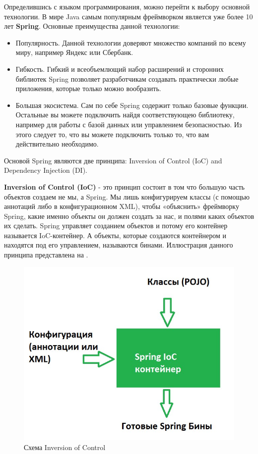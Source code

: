 Определившись с языком программирования, можно перейти к выбору основной технологии. В мире Java самым популярным фреймворком является уже более 10 лет \textbf{Spring}\cite{spring}. Основные преимущества данной технологии:

\begin{itemize}
	\item Популярность. Данной технологии доверяют множество компаний по всему миру, например Яндекс или Сбербанк.
	\item Гибкость. Гибкий и всеобъемлющий набор расширений и сторонних библиотек Spring позволяет разработчикам создавать практически любые приложения, которые только можно вообразить.   
	\item Большая экосистема. Сам по себе Spring содержит только базовые функции. Остальные вы можете подключить найдя соответствующею библиотеку, например для работы с базой данных или управлением безопасностью. Из этого следует то, что вы можете подключить только то, что вам действительно необходимо.
\end{itemize}  

Основой Spring являются две принципа: Inversion of Control (IoC) and Dependency Injection (DI).

\textbf{Inversion of Control (IoC)} - это принцип состоит в том что большую часть объектов создаем не мы, а Spring. Мы лишь конфигурируем классы (с помощью аннотаций либо в конфигурационном XML), чтобы «объяснить» фреймворку Spring, какие именно объекты он должен создать за нас, и полями каких объектов их сделать. Spring управляет созданием объектов и потому его контейнер называется IoC-контейнер. А объекты, которые создаются контейнером и находятся под его управлением, называются бинами. Иллюстрация данного принципа представлена на .

\begin{figure}[ht!] 
	\center
	\includegraphics [scale=0.5] {my_folder/images//ioc}
	\caption{Схема Inversion of Control} 
	\label{fig:ioc}  
\end{figure}

